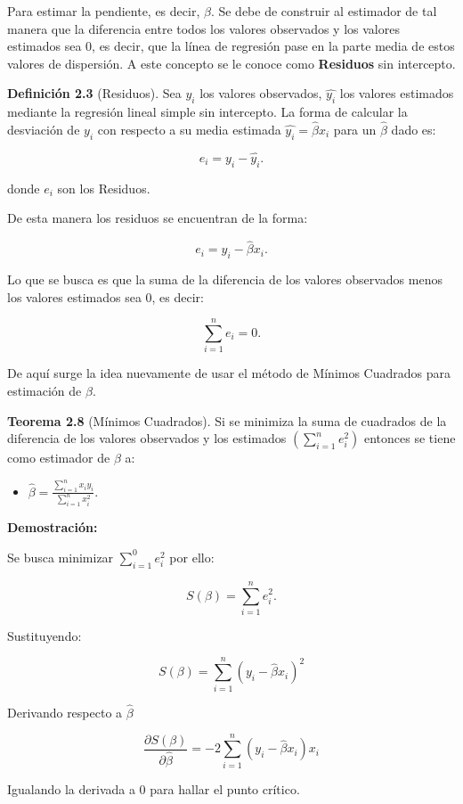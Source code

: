 \documentclass[
  a4paper,
  oneside,
  openany]{book}
\providecommand{\tightlist}{%
  \setlength{\itemsep}{0pt}\setlength{\parskip}{0pt}}
\begin{document}
Para estimar la pendiente, es decir, \(\beta.\) Se debe de construir al estimador de tal manera que la diferencia entre todos los valores observados y los valores estimados sea 0, es decir, que la línea de regresión pase en la parte media de estos valores de dispersión. A este concepto se le conoce como \textbf{Residuos} sin intercepto.

\textbf{Definición 2.3} (Residuos). Sea \(y_{i}\) los valores observados, \(\hat{y_{i}}\) los valores estimados mediante la regresión lineal simple sin intercepto. La forma de calcular la desviación de \(y_{i}\) con respecto a su media estimada \(\hat{y_{i}}=\hat{\beta}x_{i}\) para un \(\hat{\beta}\) dado es:

\[e_{i}= y_{i}-\hat{y_{i}}.\]

donde \(e_{i}\) son los Residuos.

De esta manera los residuos se encuentran de la forma:

\[e_{i}=y_{i}-\hat{\beta}x_{i}.\]

Lo que se busca es que la suma de la diferencia de los valores observados menos los valores estimados sea 0, es decir:

\[\sum_{i=1}^{n}e_{i}=0.\]

De aquí surge la idea nuevamente de usar el método de Mínimos Cuadrados para estimación de \(\beta.\)

\textbf{Teorema 2.8} (Mínimos Cuadrados).
Si se minimiza la suma de cuadrados de la diferencia de los valores observados y los estimados \(\left(\sum_{i=1}^{n}e_{i}^2\right)\) entonces se tiene como estimador de \(\beta\) a:

\begin{itemize}
\tightlist
\item
  \(\hat{\beta}=\frac{\sum_{i=1}^{n}x_{i}y_{i}}{\sum_{i=1}^{n}x_{i}^2}.\)
\end{itemize}

\textbf{Demostración:}

Se busca minimizar \(\sum_{i=1}^{0}e_{i}^2\) por ello:

\[S(\beta)=\sum_{i=1}^{n}e_{i}^2.\]

Sustituyendo:

\[S(\beta)=\sum_{i=1}^{n}\left( y_{i}-\hat{\beta}x_{i}\right)^2\]

Derivando respecto a \(\hat{\beta}\)

\[\frac{\partial S(\beta)}{\partial \hat{\beta}}=-2\sum_{i=1}^{n}\left(y_{i}-\hat{\beta}x_{i}\right)x_{i}\]

Igualando la derivada a 0 para hallar el punto crítico.
\end{document}
